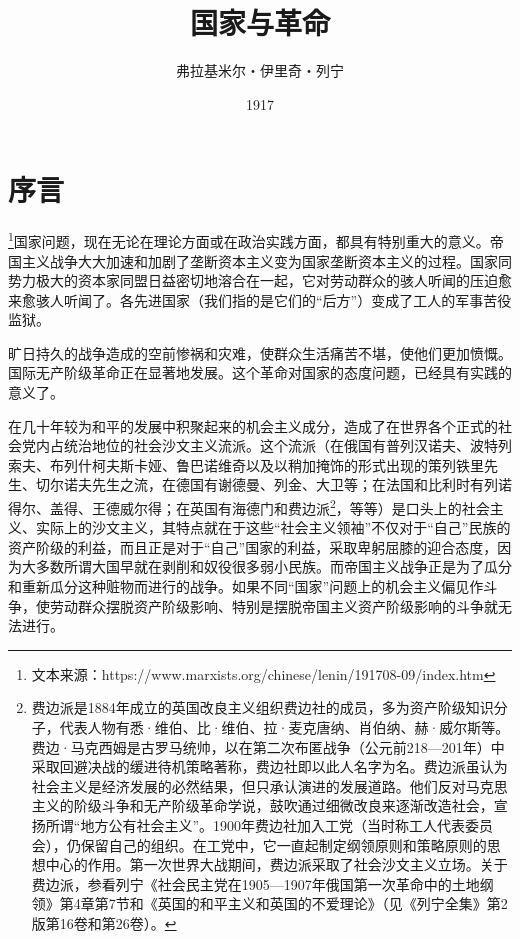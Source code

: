 \documentclass[UTF8, 12pt, a4paper]{ctexrep}
\begin{document}
\title{国家与革命}
\author{弗拉基米尔・伊里奇・列宁}
\date{1917}
\maketitle

\chapter*{序言}

\footnote{文本来源：https://www.marxists.org/chinese/lenin/191708-09/index.htm}国家问题，现在无论在理论方面或在政治实践方面，都具有特别重大的意义。帝国主义战争大大加速和加剧了垄断资本主义变为国家垄断资本主义的过程。国家同势力极大的资本家同盟日益密切地溶合在一起，它对劳动群众的骇人听闻的压迫愈来愈骇人听闻了。各先进国家（我们指的是它们的“后方”）变成了工人的军事苦役监狱。

旷日持久的战争造成的空前惨祸和灾难，使群众生活痛苦不堪，使他们更加愤慨。国际无产阶级革命正在显著地发展。这个革命对国家的态度问题，已经具有实践的意义了。

在几十年较为和平的发展中积聚起来的机会主义成分，造成了在世界各个正式的社会党内占统治地位的社会沙文主义流派。这个流派（在俄国有普列汉诺夫、波特列索夫、布列什柯夫斯卡娅、鲁巴诺维奇以及以稍加掩饰的形式出现的策列铁里先生、切尔诺夫先生之流，在德国有谢德曼、列金、大卫等；在法国和比利时有列诺得尔、盖得、王德威尔得；在英国有海德门和费边派\footnote{费边派是1884年成立的英国改良主义组织费边社的成员，多为资产阶级知识分子，代表人物有悉·维伯、比·维伯、拉·麦克唐纳、肖伯纳、赫·威尔斯等。费边·马克西姆是古罗马统帅，以在第二次布匿战争（公元前218—201年）中采取回避决战的缓进待机策略著称，费边社即以此人名字为名。费边派虽认为社会主义是经济发展的必然结果，但只承认演进的发展道路。他们反对马克思主义的阶级斗争和无产阶级革命学说，鼓吹通过细微改良来逐渐改造社会，宣扬所谓“地方公有社会主义”。1900年费边社加入工党（当时称工人代表委员会），仍保留自己的组织。在工党中，它一直起制定纲领原则和策略原则的思想中心的作用。第一次世界大战期间，费边派采取了社会沙文主义立场。关于费边派，参看列宁《社会民主党在1905—1907年俄国第一次革命中的土地纲领》第4章第7节和《英国的和平主义和英国的不爱理论》（见《列宁全集》第2版第16卷和第26卷）。}，等等）是口头上的社会主义、实际上的沙文主义，其特点就在于这些“社会主义领袖”不仅对于“自己”民族的资产阶级的利益，而且正是对于“自己”国家的利益，采取卑躬屈膝的迎合态度，因为大多数所谓大国早就在剥削和奴役很多弱小民族。而帝国主义战争正是为了瓜分和重新瓜分这种赃物而进行的战争。如果不同“国家”问题上的机会主义偏见作斗争，使劳动群众摆脱资产阶级影响、特别是摆脱帝国主义资产阶级影响的斗争就无法进行。
\end{document}

